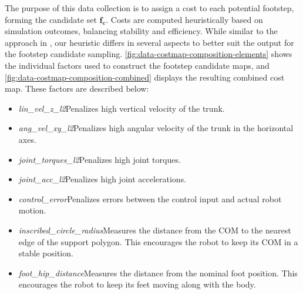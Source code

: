 The purpose of this data collection is to assign a cost to each
potential footstep, forming the candidate set $\mathbf{f_c}$. Costs
are computed heuristically based on simulation outcomes, balancing
stability and efficiency. While similar to the approach in
\cite{bratta_contactnet_2024}, our heuristic differs in several
aspects to better suit the output for the footstep candidate sampling.
\autoref{fig:data-costmap-composition-elements} shows the individual
factors used to construct the footstep candidate maps, and
\autoref{fig:data-costmap-composition-combined} displays the
resulting combined cost map. These factors are described below:

\begin{itemize}
  \item \textit{lin\_vel\_z\_l2}\textemdash Penalizes high vertical
    velocity of the trunk.
  \item \textit{ang\_vel\_xy\_l2}\textemdash Penalizes high angular
    velocity of the trunk in
    the horizontal axes.
  \item \textit{joint\_torques\_l2}\textemdash Penalizes high joint torques.
  \item \textit{joint\_acc\_l2}\textemdash Penalizes high joint accelerations.
  \item \textit{control\_error}\textemdash Penalizes errors between the control
    input and actual robot motion.
  \item \textit{inscribed\_circle\_radius}\textemdash Measures the distance
    from the COM to the nearest edge of the support polygon. This
    encourages the robot to keep its COM in a stable position.
  \item \textit{foot\_hip\_distance}\textemdash Measures the distance from
    the nominal foot position. This encourages the robot to keep its feet
    moving along with the body.
\end{itemize}

